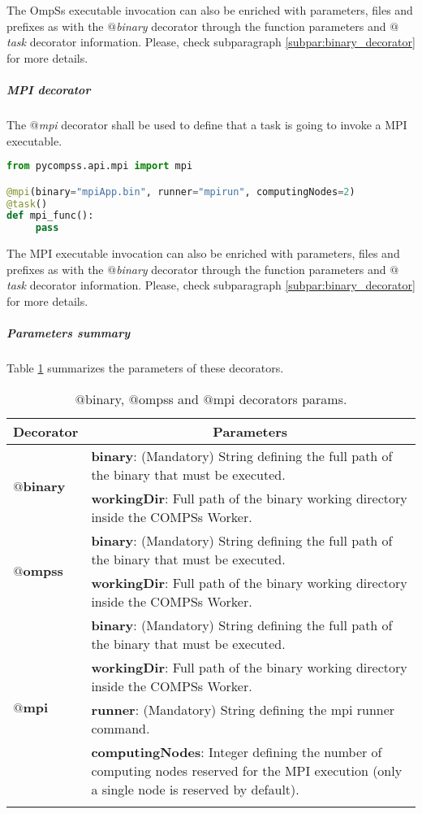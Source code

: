 The OmpSs executable invocation can also be enriched with parameters, files and prefixes as with the 
{\it $@$binary} decorator through the function parameters and {\it $@$task} decorator information.
Please, check subparagraph \ref{subpar:binary_decorator} for more details.

\subparagraph{MPI decorator}
\label{subpar:mpi_decorator}

The {\it $@$mpi} decorator shall be used to define that a task is going to invoke a MPI executable.

\begin{lstlisting}[language=python]
from pycompss.api.mpi import mpi

@mpi(binary="mpiApp.bin", runner="mpirun", computingNodes=2)
@task()
def mpi_func():
     pass
\end{lstlisting}

The MPI executable invocation can also be enriched with parameters, files and prefixes as with the 
{\it $@$binary} decorator through the function parameters and {\it $@$task} decorator information.
Please, check subparagraph \ref{subpar:binary_decorator} for more details.

\subparagraph{Parameters summary}

Table \ref{tab:other_decorators} summarizes the parameters of these decorators.

\bgroup
  \def\arraystretch{1.5}%
  \begin{longtable}{| p{} | p{} |}
    \hline
    \multicolumn{1}{|c|}{{\bf Decorator }} &  \multicolumn{1}{c|}{{\bf Parameters }}\\
    \hline
        \multirow{2}{*}{{\bf $@$binary}} & {\bf binary}: (Mandatory) String defining the full path of the binary that must be executed. \\
                                         & {\bf workingDir}: Full path of the binary working directory inside the COMPSs Worker. \\
    \hline
        \multirow{2}{*}{{\bf $@$ompss}} & {\bf binary}: (Mandatory) String defining the full path of the binary that must be executed. \\
                                        & {\bf workingDir}: Full path of the binary working directory inside the COMPSs Worker. \\
    \hline
        \multirow{4}{*}{{\bf $@$mpi}} & {\bf binary}: (Mandatory) String defining the full path of the binary that must be executed. \\
                                      & {\bf workingDir}: Full path of the binary working directory inside the COMPSs Worker. \\
                                      & {\bf runner}: (Mandatory) String defining the mpi runner command. \\
                                      & {\bf computingNodes}: Integer defining the number of computing nodes reserved for the MPI execution
		                        (only a single node is reserved by default). \\
    \hline
     \caption{$@$binary, $@$ompss and $@$mpi decorators params.}
    \label{tab:other_decorators}
  \end{longtable}
\egroup

